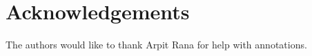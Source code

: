\documentclass[a4paper,man,natbib]{apa6}
\begin{document}
\section{Acknowledgements}
The authors would like to thank Arpit Rana for help with annotations.
%
%
%






\end{document}
